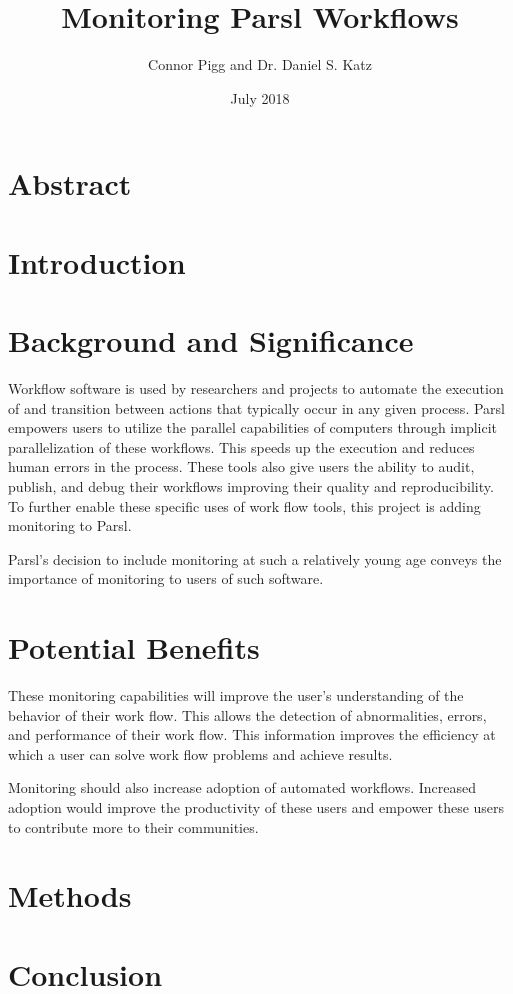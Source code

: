 \documentclass{article}
\title{Monitoring Parsl Workflows}
\author{Connor Pigg and Dr. Daniel S. Katz}
\date{July 2018}
\begin{document}
\maketitle

\section{Abstract}

\pagebreak

\section{Introduction}


\section{Background and Significance}
Workflow software is used by researchers and projects to automate the execution of and transition between actions that typically occur in any given process.
Parsl empowers users to utilize the parallel capabilities of computers through implicit parallelization of these workflows.
This speeds up the execution and reduces human errors in the process.
These tools also give users the ability to audit, publish, and debug their workflows improving their quality and reproducibility.
To further enable these specific uses of work flow tools, this project is adding monitoring to Parsl.

Parsl's decision to include monitoring at such a relatively young age conveys the importance of monitoring to users of such software.

\section{Potential Benefits}
These monitoring capabilities will improve the user's understanding of the behavior of their work flow.
This allows the detection of abnormalities, errors, and performance of their work flow.
This information improves the efficiency at which a user can solve work flow problems and achieve results.

Monitoring should also increase adoption of automated workflows.
Increased adoption would improve the productivity of these users and empower these users to contribute more to their communities.

\section{Methods}


\section{Conclusion}




\end{document}
